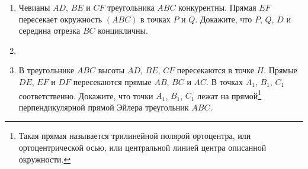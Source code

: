 \begin{enumerate}[resume*]
\begin{enumerate}
    \end{enumerate}
    \item Чевианы $AD$, $BE$ и $CF$ треугольника $ABC$ конкурентны. Прямая $EF$ пересекает окружность $(ABC)$ в точках $P$ и $Q$. Докажите, что $P$, $Q$, $D$ и середина отрезка $BC$ концикличны.

    \item {}

    \item В треугольнике $ABC$ высоты $AD$, $BE$, $CF$ пересекаются в точке $H$. Прямые $DE$, $EF$ и $DF$ пересекаются прямые $AB$, $BC$ и $AC$. В точках $A_1$, $B_1$, $C_1$ соответственно. Докажите, что точки $A_1$, $B_1$, $C_1$ лежат на прямой\footnote{Такая прямая называется трилинейной полярой ортоцентра, или ортоцентрической осью, или центральной линией центра описанной окружности.} перпендикулярной прямой Эйлера треугольник $ABC$.

\end{enumerate}

